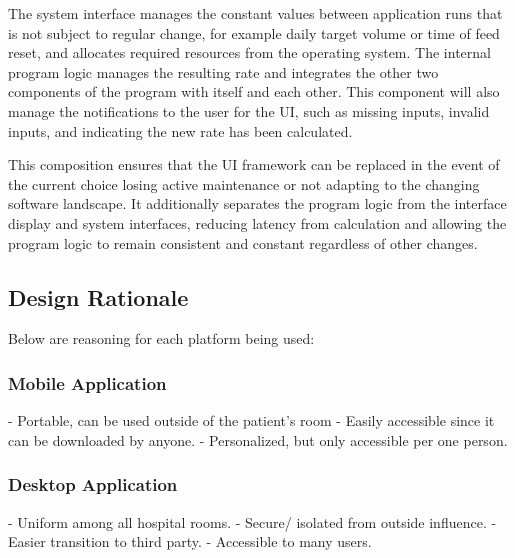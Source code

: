 \documentclass[onecolumn, draftclsnofoot,10pt, compsoc]{IEEEtran}
\begin{document}
The system interface manages the constant values between application runs that is not subject to regular change, for example daily target volume or time of feed reset, and allocates required resources from the operating system.
The internal program logic manages the resulting rate and integrates the other two components of the program with itself and each other.
This component will also manage the notifications to the user for the UI, such as missing inputs, invalid inputs, and indicating the new rate has been calculated.

This composition ensures that the UI framework can be replaced in the event of the current choice losing active maintenance or not adapting to the changing software landscape.
It additionally separates the program logic from the interface display and system interfaces, reducing latency from calculation and allowing the program logic to remain consistent and constant regardless of other changes.

\subsection{Design Rationale}
Below are reasoning for each platform being used:
\subsubsection{Mobile Application}
- Portable, can be used outside of the patient's room
\newline
- Easily accessible since it can be downloaded by anyone.
\newline
- Personalized, but only accessible per one person.

\subsubsection{Desktop Application}
- Uniform among all hospital rooms.
\newline
- Secure/ isolated from outside influence.
\newline
- Easier transition to third party.
\newline
- Accessible to many users.
\end{document}
